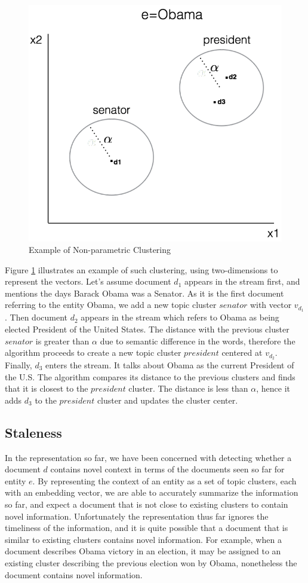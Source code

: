 \documentclass{article}
\newcommand{\todo}[1]{\noindent{\textcolor{red}{\{{\bf TODO:}  #1\}}}}
\begin{document}
\begin{figure}[tb]
\centering
\includegraphics[width=0.7\columnwidth]{fig/obamaExample.pdf}
\caption{Example of Non-parametric Clustering}
\label{obama}
\end{figure}

Figure \ref{obama} illustrates an example of such clustering, using two-dimensions to represent the vectors.
Let's assume document $d_1$ appears in the stream first, and mentions the days Barack Obama was a Senator. As it is the first document referring to the entity Obama, we add a new topic cluster $senator$ with vector $v_{d_1}$. 
Then document $d_2$ appears in the stream which refers to Obama as being elected President of the United States. 
The distance with the previous cluster $senator$ is greater than $\alpha$ due to semantic difference in the words, therefore the algorithm proceeds to create a new topic cluster $president$ centered at $v_{d_2}$. 
Finally, $d_3$ enters the stream. 
It talks about Obama as the current President of the U.S. 
The algorithm compares its distance to the previous clusters and finds that it is closest to the $president$ cluster. 
The distance is less than $\alpha$, hence it adds $d_3$ to the $president$ cluster and updates the cluster center. 

\subsection{Staleness}
\label{staleness}

\todo{too much so far, thus far?}In the representation so far, we have been concerned with detecting whether a document $d$ contains novel context in terms of the documents seen so far for entity $e$.
By representing the context of an entity as a set of topic clusters, each with an embedding vector, we are able to accurately summarize the information so far, and expect a document that is not close to existing clusters to contain novel information.
Unfortunately the representation thus far ignores the timeliness of the information, and it is quite possible that a document that is similar to existing clusters contains novel information.
For example, when a document describes Obama victory in an election, it may be assigned to an existing cluster describing the previous election won by Obama, nonetheless the document contains novel information.
\end{document}
